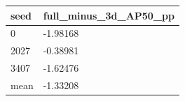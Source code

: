\begin{tabular}{ll}
\hline
seed & full\_minus\_3d\_AP50\_pp \\
\hline
0 & -1.98168 \\
2027 & -0.38981 \\
3407 & -1.62476 \\
mean & -1.33208 \\
\hline
\end{tabular}

